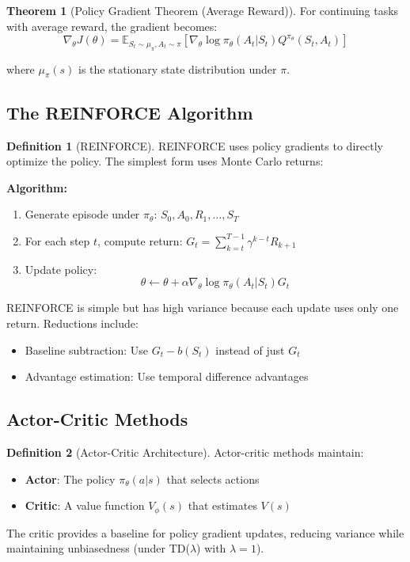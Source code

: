\documentclass[12pt,a4paper]{article}
\theoremstyle{definition}
\newtheorem{definition}{Definition}[section]
\newtheorem{theorem}{Theorem}[section]
\begin{document}
\begin{theorem}[Policy Gradient Theorem (Average Reward)]
For continuing tasks with average reward, the gradient becomes:
\[
\nabla_\theta J(\theta) = \mathbb{E}_{S_t \sim \mu_\pi, A_t \sim \pi} \left[ \nabla_\theta \log \pi_\theta(A_t|S_t) Q^{\pi_\theta}(S_t, A_t) \right]
\]

where $\mu_\pi(s)$ is the stationary state distribution under $\pi$.
\end{theorem}

\subsection{The REINFORCE Algorithm}

\begin{definition}[REINFORCE]
REINFORCE uses policy gradients to directly optimize the policy. The simplest form uses Monte Carlo returns:

\textbf{Algorithm:}
\begin{enumerate}
    \item Generate episode under $\pi_\theta$: $S_0, A_0, R_1, \ldots, S_T$
    \item For each step $t$, compute return: $G_t = \sum_{k=t}^{T-1} \gamma^{k-t} R_{k+1}$
    \item Update policy: 
    \[
    \theta \leftarrow \theta + \alpha \nabla_\theta \log \pi_\theta(A_t|S_t) G_t
    \]
\end{enumerate}

REINFORCE is simple but has high variance because each update uses only one return. Reductions include:
\begin{itemize}
    \item Baseline subtraction: Use $G_t - b(S_t)$ instead of just $G_t$
    \item Advantage estimation: Use temporal difference advantages
\end{itemize}
\end{definition}

\subsection{Actor-Critic Methods}

\begin{definition}[Actor-Critic Architecture]
Actor-critic methods maintain:
\begin{itemize}
    \item \textbf{Actor}: The policy $\pi_\theta(a|s)$ that selects actions
    \item \textbf{Critic}: A value function $V_\phi(s)$ that estimates $V(s)$
\end{itemize}

The critic provides a baseline for policy gradient updates, reducing variance while maintaining unbiasedness (under TD($\lambda$) with $\lambda = 1$).
\end{definition}
\end{document}
